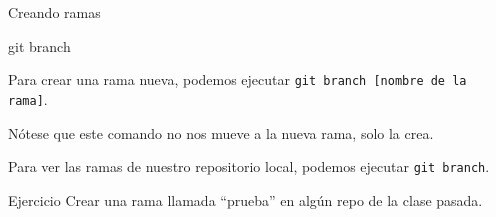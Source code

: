 \begin{frame}[t]{Creando ramas}
    \begin{comando}
        git branch
    \end{comando}

    \pause
    \begin{block}{}
        Para crear una rama nueva, podemos ejecutar \texttt{git branch [nombre de la rama]}.

        \vspace{.4em}

        Nótese que este comando no nos mueve a la nueva rama, solo la crea.

        \vspace{.4em}

        Para ver las ramas de nuestro repositorio local, podemos ejecutar \texttt{git branch}.
    \end{block}

    \pause
    \begin{ejercicio}{Ejercicio}
        Crear una rama llamada ``prueba'' en algún repo de la clase pasada.
    \end{ejercicio}

\end{frame}


